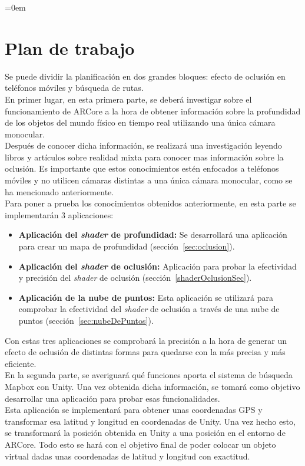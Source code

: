 \parindent=0em
\section{Plan de trabajo}
\noindent

Se puede dividir la planificación en dos grandes bloques: efecto de oclusión en teléfonos móviles y búsqueda de rutas.\\

En primer lugar, en esta primera parte, se deberá investigar sobre el funcionamiento de ARCore a la hora de obtener información sobre la profundidad de los objetos del mundo físico en tiempo real utilizando una única cámara monocular.\\

Después de conocer dicha información, se realizará una investigación leyendo libros y artículos sobre realidad mixta para conocer mas información sobre la oclusión. Es importante que estos conocimientos estén enfocados a teléfonos móviles y no utilicen cámaras distintas a una única cámara monocular, como se ha mencionado anteriormente.\\

Para poner a prueba los conocimientos obtenidos anteriormente, en esta parte se implementarán 3 aplicaciones:

\begin{itemize}
    \item \textbf{Aplicación del \textit{shader} de profundidad:} Se desarrollará una aplicación para crear un mapa de profundidad (sección~\ref{sec:oclusion}).
    
    \item \textbf{Aplicación del \textit{shader} de oclusión:} Aplicación para probar la efectividad y precisión del \textit{shader} de oclusión (sección~\ref{shaderOclusionSec}).
    
    \item \textbf{Aplicación de la nube de puntos:} Esta aplicación se utilizará para comprobar la efectividad del \textit{shader} de oclusión a través de una nube de puntos (sección~\ref{sec:nubeDePuntos}).
\end{itemize}

Con estas tres aplicaciones se comprobará la precisión a la hora de generar un efecto de oclusión de distintas formas para quedarse con la más precisa y más eficiente.\\

En la segunda parte, se averiguará qué funciones aporta el sistema de búsqueda Mapbox con Unity. Una vez obtenida dicha información, se tomará como objetivo desarrollar una aplicación para probar esas funcionalidades.\\

Esta aplicación se implementará para obtener unas coordenadas GPS y transformar esa latitud y longitud en coordenadas de Unity. Una vez hecho esto, se transformará la posición obtenida en Unity a una posición en el entorno de ARCore. Todo esto se hará con el objetivo final de poder colocar un objeto virtual dadas unas coordenadas de latitud y longitud con exactitud.









